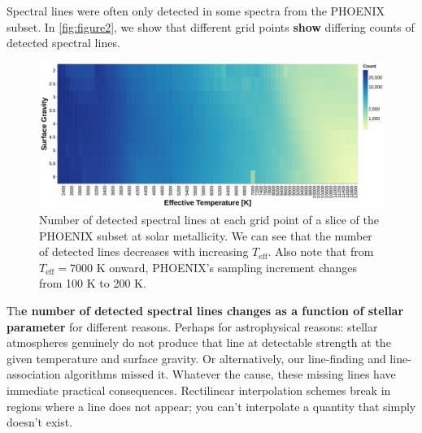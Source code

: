 \documentclass[twocolumn, linenumbers]{aastex631}
\begin{document}
Spectral lines were often only detected in some spectra from the PHOENIX subset.
In \autoref{fig:figure2}, we show that different grid points \textbf{show} differing counts of detected spectral lines.
\begin{figure}
    \centering
    \includegraphics[width=\textwidth]{figure2}
    \caption{Number of detected spectral lines at each grid point of a slice of the PHOENIX subset at solar metallicity.
    We can see that the number of detected lines decreases with increasing $T_{\mathrm{eff}}$.
    Also note that from $T_{\mathrm{eff}} = 7000$ K onward, PHOENIX's sampling increment changes from 100 K to 200 K.}
    \label{fig:figure2}
\end{figure}

Th\textbf{e number of detected spectral lines changes as a function of stellar parameter} for different reasons.
Perhaps for astrophysical reasons: stellar atmospheres genuinely do not produce that line at detectable strength at the given temperature and surface gravity.
Or alternatively, our line-finding and line-association algorithms missed it.
Whatever the cause, these missing lines have immediate practical consequences.
Rectilinear interpolation schemes break in regions where a line does not appear; you can't interpolate a quantity that simply doesn't exist.
\end{document}
